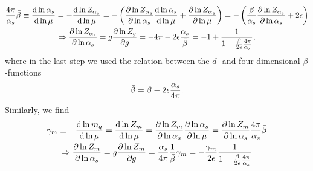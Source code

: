 \begin{equation}
\begin{gathered}
\frac{4\pi}{\alpha_s} \bar{\beta} \equiv \frac{\mathrm{d} \ln \alpha_s}{\mathrm{d} \ln \mu} = - \frac{\mathrm{d} \ln Z_{\alpha_s}}{\mathrm{d} \ln \mu} = - \left( \frac{\partial \ln Z_{\alpha_s}}{\partial \ln \alpha_s} \frac{\mathrm{d} \ln \alpha_s}{\mathrm{d} \ln \mu} + \frac{\partial \ln Z_{\alpha_s}}{\partial \ln\mu} \right) = - \left(  \frac{\bar{\beta}}{\alpha_s} \frac{\partial \ln Z_{\alpha_s}}{\partial \ln \alpha_s} + 2 \epsilon \right) \\
\Rightarrow \frac{\partial \ln Z_{\alpha_s}}{\partial \ln \alpha_s} = g \frac{\partial \ln Z_g}{\partial g} = - 4\pi - 2 \epsilon \frac{\alpha_s}{\bar{\beta}} = -1 + \frac{1}{1 - \frac{\beta}{2 \epsilon} \frac{4 \pi}{\alpha_s}},
\end{gathered}
\end{equation}
where in the last step we used the relation between the $d$- and four-dimensional $\beta$-functions
\begin{equation}
\bar{\beta} = \beta - 2 \epsilon \frac{\alpha_s}{4 \pi}.
\label{eq:4:d_dimensional_beta_function}
\end{equation}
Similarly, we find
\begin{equation}
\begin{gathered}
\gamma_m \equiv - \frac{\mathrm{d} \ln m_q}{\mathrm{d} \ln \mu} = \frac{\mathrm{d} \ln Z_m}{\mathrm{d} \ln \mu} = \frac{\partial \ln Z_m}{\partial \ln \alpha_s} \frac{\partial \ln \alpha_s}{\partial \ln \mu} = \frac{\partial \ln Z_m}{\partial \ln \alpha_s} \frac{4 \pi}{\alpha_s} \bar{\beta} \\
\Rightarrow \frac{\partial \ln Z_m}{ \partial \ln \alpha_s} = g \frac{\partial \ln Z_m}{\partial g} = \frac{\alpha_s}{4 \pi} \frac{1}{\bar{\beta}} \gamma_m = - \frac{\gamma_m}{2 \epsilon} \frac{1}{1 - \frac{\beta}{2 \epsilon} \frac{4 \pi}{\alpha_s}}
\end{gathered}
\end{equation}

